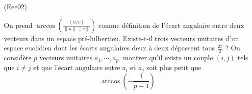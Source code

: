 \begin{tiny}(Eee02)\end{tiny} On prend $\arccos (\frac{(u / v)}{\left\| u\right\| \,\left\| v\right\| })$ comme d{\'e}finition de l'{\'e}cart angulaire entre deux vecteurs dans un espace pré-hilbertien.\newline
Existe-t-il trois vecteurs unitaires d'un espace euclidien dont les {\'e}carts angulaires deux {\`a} deux d{\'e}passent tous $\frac{2\pi }{3}$ ?\newline
On considère $p$ vecteurs unitaires $a_1,\cdots, a_p$, montrer qu'il existe un couple $(i,j)$ tels que $i\neq j$ et que l'écart angulaire entre $a_i$ et $a_j$ soit plus petit que 
\begin{displaymath}
  \arccos\left( -\frac{1}{p-1}\right) 
\end{displaymath}

